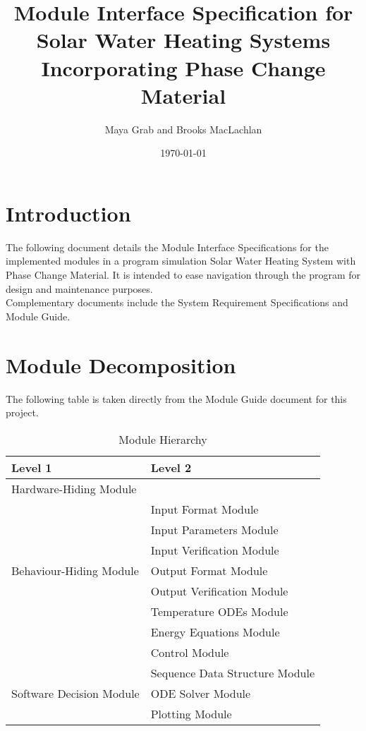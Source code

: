 \documentclass[12pt]{article}
\begin{document}
\title{Module Interface Specification for Solar Water Heating Systems
  Incorporating Phase Change Material} 
\author{Maya Grab and Brooks MacLachlan}
\date{\today}
	
\maketitle

\tableofcontents

\section{Introduction}
The following document details the Module Interface Specifications for the implemented 
modules in a program simulation Solar Water Heating System with Phase Change Material.
 It is intended to ease navigation through the program for design and maintenance purposes.\\
  Complementary documents include the System Requirement Specifications and Module Guide. 

\section{Module Decomposition}
The following table is taken directly from the Module Guide document for this project.
\begin{table}[!h]
\centering
\begin{tabular}{p{} p{}}
\toprule
\textbf{Level 1} & \textbf{Level 2}\\
\midrule

{Hardware-Hiding Module} & ~ \\
\midrule

\multirow{7}{0.3\textwidth}{Behaviour-Hiding Module} & Input Format Module\\
& Input Parameters Module\\
& Input Verification Module\\
& Output Format Module\\
& Output Verification Module\\
& Temperature ODEs Module\\
& Energy Equations Module\\ 
& Control Module\\
\midrule

\multirow{3}{0.3\textwidth}{Software Decision Module} & {Sequence Data Structure Module}\\
& ODE Solver Module\\
& Plotting Module\\
\bottomrule

\end{tabular}
\caption{Module Hierarchy}
\label{TblMH}
\end{table}
\end{document}
